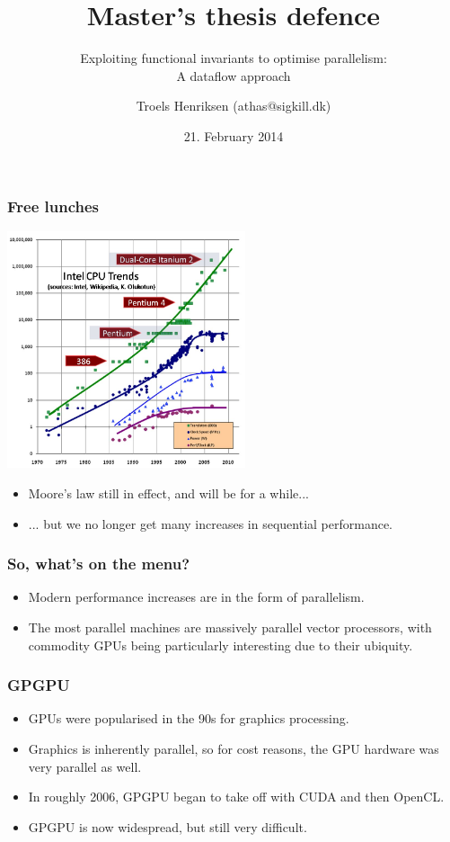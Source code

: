 \documentclass{beamer}
\title{Master's thesis defence}
\subtitle{Exploiting functional invariants to optimise parallelism:\\ A dataflow approach}
\author{Troels Henriksen (athas@sigkill.dk)}
\date{21. February 2014}
\institute{Computer Science\\
  University of Copenhagen}
\begin{document}
\frame{\titlepage}

\begin{frame}
  \frametitle{Free lunches}

  \centering
  \includegraphics[width=7cm]{img/CPU-Scaling.jpg}

  \begin{itemize}
  \item Moore's law still in effect, and will be for a while...
  \item ... but we no longer get many increases in sequential
    performance.
  \end{itemize}

\end{frame}

\begin{frame}
  \frametitle{So, what's on the menu?}

  \begin{itemize}
  \item Modern performance increases are in the form of parallelism.
  \item The most parallel machines are massively parallel vector
    processors, with commodity GPUs being particularly interesting due
    to their ubiquity.
  \end{itemize}
\end{frame}

\begin{frame}
  \frametitle{GPGPU}

  \begin{itemize}
  \item GPUs were popularised in the 90s for graphics processing.
  \item Graphics is inherently parallel, so for cost reasons, the GPU
    hardware was very parallel as well.
  \item In roughly 2006, GPGPU began to take off with CUDA and then
    OpenCL.
  \item GPGPU is now widespread, but still very difficult.
  \end{itemize}
\end{frame}
\end{document}
